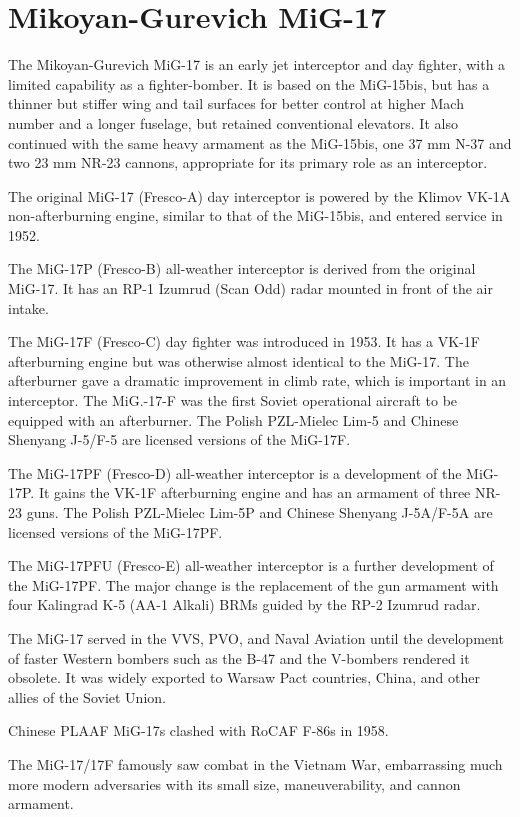 \section{Mikoyan-Gurevich MiG-17}

The Mikoyan-Gurevich MiG-17 is an early jet interceptor and day fighter, with a limited capability as a fighter-bomber. It is based on the MiG-15bis, but has a thinner but stiffer wing and tail surfaces for better control at higher Mach number and a longer fuselage, but retained conventional elevators. It also continued with the same heavy armament as the MiG-15bis, one 37 mm N-37 and two 23 mm NR-23 cannons, appropriate for its primary role as an interceptor.

The original MiG-17 (Fresco-A) day interceptor is powered by the Klimov VK-1A non-afterburning engine, similar to that of the MiG-15bis, and entered service in 1952.

The MiG-17P (Fresco-B) all-weather interceptor is derived from the original MiG-17. It has an RP-1 Izumrud (Scan Odd) radar mounted in front of the air intake.

The MiG-17F (Fresco-C) day fighter was introduced in 1953. It has a VK-1F afterburning engine but was otherwise almost identical to the MiG-17. The afterburner gave a dramatic improvement in climb rate, which is important in an interceptor. The MiG.-17-F was the first Soviet operational aircraft to be equipped with an afterburner. The Polish PZL-Mielec Lim-5 and Chinese Shenyang J-5/F-5 are licensed versions of the MiG-17F.

The MiG-17PF (Fresco-D) all-weather interceptor is a development of the MiG-17P. It gains the VK-1F afterburning engine and has an armament of three NR-23 guns. The Polish PZL-Mielec Lim-5P and Chinese Shenyang J-5A/F-5A are licensed versions of the MiG-17PF.

The MiG-17PFU (Fresco-E) all-weather interceptor is a further development of the MiG-17PF. The major change is the replacement of the gun armament with four Kalingrad K-5 (AA-1 Alkali) BRMs guided by the RP-2 Izumrud radar.

The MiG-17 served in the VVS, PVO, and Naval Aviation until the development of faster Western bombers such as the B-47 and the V-bombers rendered it obsolete. It was widely exported to Warsaw Pact countries, China, and other allies of the Soviet Union.

Chinese PLAAF MiG-17s clashed with RoCAF F-86s in 1958.

The MiG-17/17F famously saw combat in the Vietnam War, embarrassing much more modern adversaries with its small size, maneuverability, and cannon armament.

